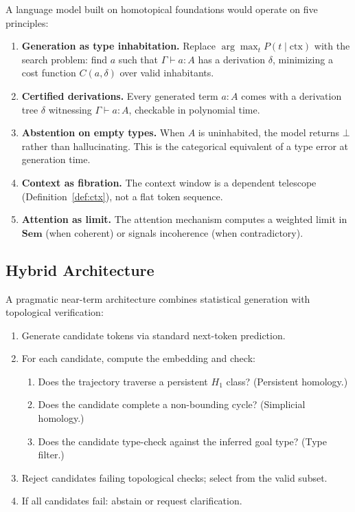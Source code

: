 \documentclass[11pt,a4paper]{article}
\theoremstyle{plain}
\theoremstyle{definition}
\newcommand{\Sem}{\mathbf{Sem}}
\begin{document}
A language model built on homotopical foundations would operate on five principles:

\begin{enumerate}[leftmargin=*]
  \item \textbf{Generation as type inhabitation.} Replace $\arg\max_t P(t \mid \text{ctx})$ with the search problem: find $a$ such that $\Gamma \vdash a : A$ has a derivation $\delta$, minimizing a cost function $C(a, \delta)$ over valid inhabitants.
  
  \item \textbf{Certified derivations.} Every generated term $a : A$ comes with a derivation tree $\delta$ witnessing $\Gamma \vdash a : A$, checkable in polynomial time.
  
  \item \textbf{Abstention on empty types.} When $A$ is uninhabited, the model returns $\bot$ rather than hallucinating. This is the categorical equivalent of a type error at generation time.
  
  \item \textbf{Context as fibration.} The context window is a dependent telescope (Definition~\ref{def:ctx}), not a flat token sequence.
  
  \item \textbf{Attention as limit.} The attention mechanism computes a weighted limit in $\Sem$ (when coherent) or signals incoherence (when contradictory).
\end{enumerate}

\subsection{Hybrid Architecture}

A pragmatic near-term architecture combines statistical generation with topological verification:

\begin{enumerate}[leftmargin=*,nosep]
  \item Generate candidate tokens via standard next-token prediction.
  \item For each candidate, compute the embedding and check:
  \begin{enumerate}[nosep]
    \item Does the trajectory traverse a persistent $H_1$ class? (Persistent homology.)
    \item Does the candidate complete a non-bounding cycle? (Simplicial homology.)
    \item Does the candidate type-check against the inferred goal type? (Type filter.)
  \end{enumerate}
  \item Reject candidates failing topological checks; select from the valid subset.
  \item If all candidates fail: abstain or request clarification.
\end{enumerate}
\end{document}
